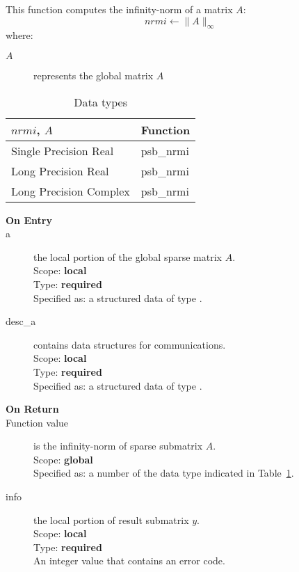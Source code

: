 %
%



This function computes the infinity-norm of a matrix $A$:\\

\[ nrmi \leftarrow \|A\|_\infty \]
where:
\begin{description}
\item[$A$] represents the global matrix $A$
\end{description}

\begin{table}[h]
\begin{center}
\begin{tabular}{ll}
\hline
$nrmi$, $A$ & {\bf Function}\\
\hline
Single Precision Real & psb\_nrmi\\
Long Precision Real & psb\_nrmi \\
Long Precision Complex & psb\_nrmi \\
\hline
\end{tabular}
\end{center}
\caption{Data types\label{tab:f90nrmi}}
\end{table}


\begin{description}
\item[\bf On Entry]
\item[a] the local  portion of the global sparse matrix
$A$. \\   
Scope: {\bf local} \\
Type: {\bf required}\\
Specified as: a structured data of type \spdata.
\item[desc\_a] contains data structures for communications.\\
Scope: {\bf local} \\
Type: {\bf required}\\
Specified as: a structured data of type \descdata.
\item[\bf On Return] 
\item[Function value] is the infinity-norm of sparse submatrix $A$.\\
Scope: {\bf global} \\
Specified as: a number of the data type indicated in Table~\ref{tab:f90nrmi}.
\item[info] the local portion of result submatrix $y$.\\
Scope: {\bf local} \\
Type: {\bf required} \\
An integer value that contains an error code. 
\end{description}


